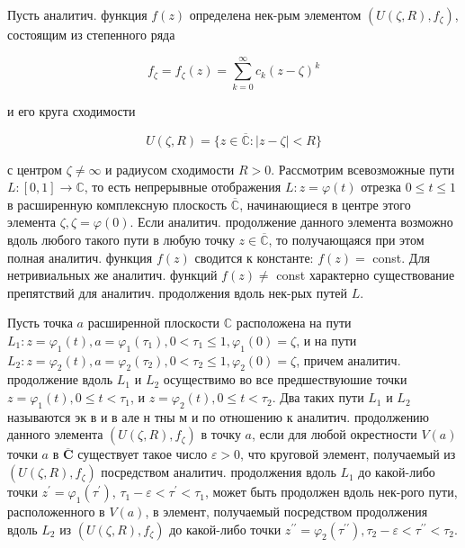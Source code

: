 \documentclass[10pt]{article}
\begin{document}
Пусть аналитич. функция $f(z)$ определена нек-рым элементом $\left(U(\zeta, R), f_{\zeta}\right)$, состоящим из степенного ряда



\[

f_{\zeta}=f_{\zeta}(z)=\sum_{k=0}^{\infty} c_{k}(z-\zeta)^{k}

\]



и его круга сходимости



\[

U(\zeta, R)=\{z \in \overline{\mathbb{C}}:|z-\zeta|<R\}

\]



с центром $\zeta \neq \infty$ и радиусом сходимости $R>0$. Рассмотрим всевозможные пути $L:[0,1] \rightarrow \mathbb{C}$, то есть непрерывные отображения $L: z=\varphi(t)$ отрезка $0 \leqslant t \leqslant 1$ в расширенную комплексную плоскость $\overline{\mathbb{C}}$, начинающиеся в центре этого элемента $\zeta, \zeta=\varphi(0)$. Если аналитич. продолжение данного элемента возможно вдоль любого такого пути в любую точку $z \in \overline{\mathbb{C}}$, то получающаяся при этом полная аналитич. функция $f(z)$ сводится к константе: $f(z)=$ const. Для нетривиальных же аналитич. функций $f(z) \neq$ const характерно существование препятствий для аналитич. продолжения вдоль нек-рых путей $L$.



Пусть точка $a$ расширенной плоскости $\mathbb{C}$ расположена на пути $L_{1}: z=\varphi_{1}(t), a=\varphi_{1}\left(\tau_{1}\right), 0<\tau_{1} \leqslant 1, \varphi_{1}(0)=\zeta$, и на пути $L_{2}: z=\varphi_{2}(t), a=\varphi_{2}\left(\tau_{2}\right), 0<\tau_{2} \leqslant 1, \varphi_{2}(0)=\zeta$, причем аналитич. продолжение вдоль $L_{1}$ и $L_{2}$ осуществимо во все предшествуюшие точки $z=\varphi_{1}(t), 0 \leqslant t<\tau_{1}$, и $z=\varphi_{2}(t), 0 \leqslant t<\tau_{2}$. Два таких пути $L_{1}$ и $L_{2}$ называются эк в и в але н тны м и по отношению к аналитич. продолжению данного элемента $\left(U(\zeta, R), f_{\zeta}\right)$ в точку $a$, если для любой окрестности $V(a)$ точки $a$ в $\overline{\boldsymbol{C}}$ существует такое число $\varepsilon>0$, что круговой элемент, получаемый из $\left(U(\zeta, R), f_{\zeta}\right)$ посредством аналитич. продолжения вдоль $L_{1}$ до какой-либо точки $z^{\prime}=\varphi_{1}\left(\tau^{\prime}\right)$, $\tau_{1}-\varepsilon<\tau^{\prime}<\tau_{1}$, может быть продолжен вдоль нек-рого пути, расположенного в $V(a)$, в элемент, получаемый посредством продолжения вдоль $L_{2}$ из $\left(U(\zeta, R), f_{\zeta}\right)$ до какой-либо точки $z^{\prime \prime}=\varphi_{2}\left(\tau^{\prime \prime}\right), \tau_{2}-\varepsilon<\tau^{\prime \prime}<\tau_{2}$.
\end{document}
